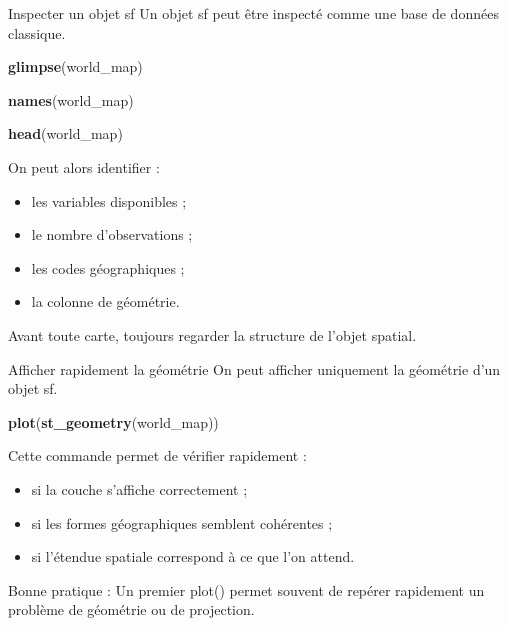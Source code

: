 \documentclass[
  10pt,
  ignorenonframetext,
]{beamer}
\newenvironment{Shaded}{\begin{snugshade}}{\end{snugshade}}
\newcommand{\FunctionTok}[1]{\textcolor[rgb]{0.13,0.29,0.53}{\textbf{#1}}}
\newcommand{\NormalTok}[1]{#1}
\begin{document}
\begin{frame}[fragile]{Inspecter un objet sf}
\label{inspecter-un-objet-sf}
Un objet sf peut être inspecté comme une base de données classique.

\begin{Shaded}
\begin{Highlighting}[]
\FunctionTok{glimpse}\NormalTok{(world\_map)}

\FunctionTok{names}\NormalTok{(world\_map)}

\FunctionTok{head}\NormalTok{(world\_map)}
\end{Highlighting}
\end{Shaded}

On peut alors identifier :

\begin{itemize}
\item les variables disponibles ;
\item le nombre d’observations ;
\item les codes géographiques ;
\item la colonne de géométrie.
\end{itemize}

Avant toute carte, toujours regarder la structure de l'objet spatial.
\end{frame}

\begin{frame}[fragile]{Afficher rapidement la géométrie}
\label{afficher-rapidement-la-guxe9omuxe9trie}
On peut afficher uniquement la géométrie d'un objet sf.

\begin{Shaded}
\begin{Highlighting}[]
\FunctionTok{plot}\NormalTok{(}\FunctionTok{st\_geometry}\NormalTok{(world\_map))}
\end{Highlighting}
\end{Shaded}

Cette commande permet de vérifier rapidement :

\begin{itemize}
\item si la couche s’affiche correctement ;
\item si les formes géographiques semblent cohérentes ;
\item si l’étendue spatiale correspond à ce que l’on attend.
\end{itemize}

Bonne pratique : Un premier plot() permet souvent de repérer rapidement
un problème de géométrie ou de projection.
\end{frame}
\end{document}
